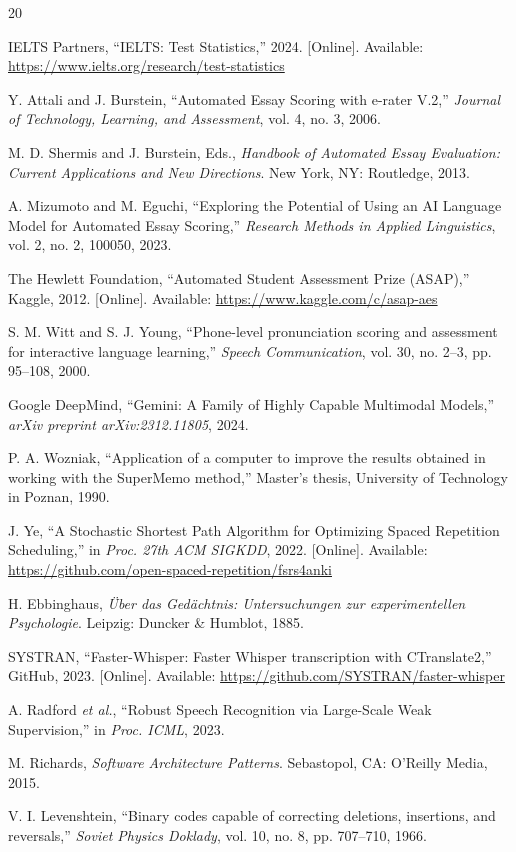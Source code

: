 \documentclass[conference]{IEEEtran}
\begin{document}

\begin{thebibliography}{20}

IELTS Partners, ``IELTS: Test Statistics,'' 2024. [Online]. Available: \url{https://www.ielts.org/research/test-statistics}

Y. Attali and J. Burstein, ``Automated Essay Scoring with e-rater V.2,'' \textit{Journal of Technology, Learning, and Assessment}, vol. 4, no. 3, 2006.

M. D. Shermis and J. Burstein, Eds., \textit{Handbook of Automated Essay Evaluation: Current Applications and New Directions}. New York, NY: Routledge, 2013.

A. Mizumoto and M. Eguchi, ``Exploring the Potential of Using an AI Language Model for Automated Essay Scoring,'' \textit{Research Methods in Applied Linguistics}, vol. 2, no. 2, 100050, 2023.

The Hewlett Foundation, ``Automated Student Assessment Prize (ASAP),'' Kaggle, 2012. [Online]. Available: \url{https://www.kaggle.com/c/asap-aes}

S. M. Witt and S. J. Young, ``Phone-level pronunciation scoring and assessment for interactive language learning,'' \textit{Speech Communication}, vol. 30, no. 2--3, pp. 95--108, 2000.

Google DeepMind, ``Gemini: A Family of Highly Capable Multimodal Models,'' \textit{arXiv preprint arXiv:2312.11805}, 2024.

P. A. Wozniak, ``Application of a computer to improve the results obtained in working with the SuperMemo method,'' Master's thesis, University of Technology in Poznan, 1990.

J. Ye, ``A Stochastic Shortest Path Algorithm for Optimizing Spaced Repetition Scheduling,'' in \textit{Proc. 27th ACM SIGKDD}, 2022. [Online]. Available: \url{https://github.com/open-spaced-repetition/fsrs4anki}

H. Ebbinghaus, \textit{{\"U}ber das Ged{\"a}chtnis: Untersuchungen zur experimentellen Psychologie}. Leipzig: Duncker \& Humblot, 1885.

SYSTRAN, ``Faster-Whisper: Faster Whisper transcription with CTranslate2,'' GitHub, 2023. [Online]. Available: \url{https://github.com/SYSTRAN/faster-whisper}

A. Radford \textit{et al.}, ``Robust Speech Recognition via Large-Scale Weak Supervision,'' in \textit{Proc. ICML}, 2023.

M. Richards, \textit{Software Architecture Patterns}. Sebastopol, CA: O'Reilly Media, 2015.

V. I. Levenshtein, ``Binary codes capable of correcting deletions, insertions, and reversals,'' \textit{Soviet Physics Doklady}, vol. 10, no. 8, pp. 707--710, 1966.

\end{thebibliography}
\end{document}
